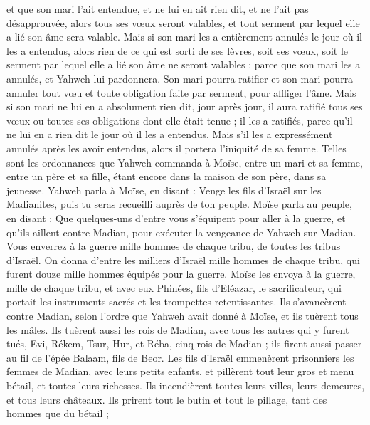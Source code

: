 \begin{multicols}{2}
et que son mari l'ait entendue, et ne lui en ait rien dit, et ne l'ait pas désapprouvée, alors tous ses vœux seront valables, et tout serment par lequel elle a lié son âme sera valable.
Mais si son mari les a entièrement annulés le jour où il les a entendus, alors rien de ce qui est sorti de ses lèvres, soit ses vœux, soit le serment par lequel elle a lié son âme ne seront valables ; parce que son mari les a annulés, et Yahweh lui pardonnera.
Son mari pourra ratifier et son mari pourra annuler tout vœu et toute obligation faite par serment, pour affliger l'âme.
Mais si son mari ne lui en a absolument rien dit, jour après jour, il aura ratifié tous ses vœux ou toutes ses obligations dont elle était tenue ; il les a ratifiés, parce qu'il ne lui en a rien dit le jour où il les a entendus.
Mais s'il les a expressément annulés après les avoir entendus, alors il portera l'iniquité de sa femme.
Telles sont les ordonnances que Yahweh commanda à Moïse, entre un mari et sa femme, entre un père et sa fille, étant encore dans la maison de son père, dans sa jeunesse.
\VerseOne{}Yahweh parla à Moïse, en disant :
Venge les fils d'Israël sur les Madianites, puis tu seras recueilli auprès de ton peuple.
Moïse parla au peuple, en disant : Que quelques-uns d'entre vous s'équipent pour aller à la guerre, et qu'ils aillent contre Madian, pour exécuter la vengeance de Yahweh sur Madian.
Vous enverrez à la guerre mille hommes de chaque tribu, de toutes les tribus d'Israël.
On donna d'entre les milliers d'Israël mille hommes de chaque tribu, qui furent douze mille hommes équipés pour la guerre.
Moïse les envoya à la guerre, mille de chaque tribu, et avec eux Phinées, fils d'Eléazar, le sacrificateur, qui portait les instruments sacrés et les trompettes retentissantes.
Ils s'avancèrent contre Madian, selon l'ordre que Yahweh avait donné à Moïse, et ils tuèrent tous les mâles.
Ils tuèrent aussi les rois de Madian, avec tous les autres qui y furent tués, Evi, Rékem, Tsur, Hur, et Réba, cinq rois de Madian ; ils firent aussi passer au fil de l'épée Balaam, fils de Beor.
Les fils d'Israël emmenèrent prisonniers les femmes de Madian, avec leurs petits enfants, et pillèrent tout leur gros et menu bétail, et toutes leurs richesses.
Ils incendièrent toutes leurs villes, leurs demeures, et tous leurs châteaux.
Ils prirent tout le butin et tout le pillage, tant des hommes que du bétail ;

\end{multicols}
